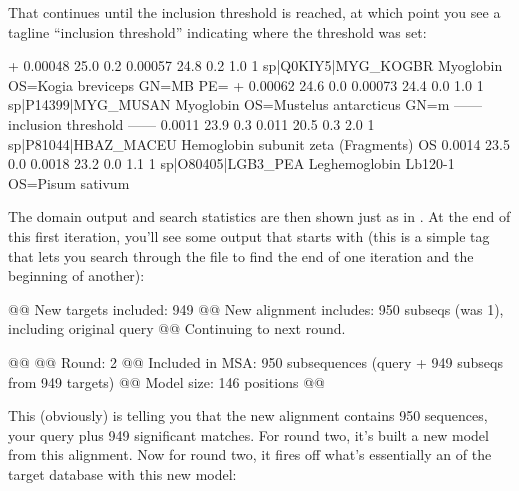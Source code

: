 That continues until the inclusion threshold is reached, at which
point you see a tagline ``inclusion threshold'' indicating where the
threshold was set:

\begin{samepage}
\begin{sreoutput}
+   0.00048   25.0   0.2    0.00057   24.8   0.2    1.0  1  sp|Q0KIY5|MYG_KOGBR    Myoglobin OS=Kogia breviceps GN=MB PE=
+   0.00062   24.6   0.0    0.00073   24.4   0.0    1.0  1  sp|P14399|MYG_MUSAN    Myoglobin OS=Mustelus antarcticus GN=m
  ------ inclusion threshold ------
     0.0011   23.9   0.3      0.011   20.5   0.3    2.0  1  sp|P81044|HBAZ_MACEU   Hemoglobin subunit zeta (Fragments) OS
     0.0014   23.5   0.0     0.0018   23.2   0.0    1.1  1  sp|O80405|LGB3_PEA     Leghemoglobin Lb120-1 OS=Pisum sativum
\end{sreoutput}
\end{samepage}

The domain output and search statistics are then shown just as in
. At the end of this first iteration, you'll see some
output that starts with  (this is a simple tag that lets you
search through the file to find the end of one iteration and the
beginning of another):

\begin{samepage}
\begin{sreoutput}
@@ New targets included:   949
@@ New alignment includes: 950 subseqs (was 1), including original query
@@ Continuing to next round.

@@
@@ Round:                  2
@@ Included in MSA:        950 subsequences (query + 949 subseqs from 949 targets)
@@ Model size:             146 positions
@@
\end{sreoutput}
\end{samepage}

This (obviously) is telling you that the new alignment contains 950
sequences, your query plus 949 significant matches. For round two,
it's built a new model from this alignment. Now for round two, it
fires off what's essentially an  of the target
database with this new model:

